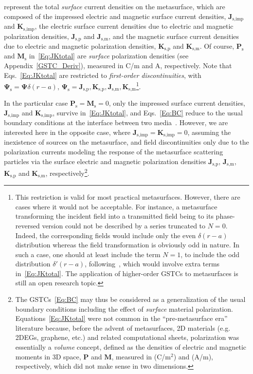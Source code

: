 \documentclass[journal,transaction]{IEEEtran}
\newcommand{\ve}[1]{\mathbf{#1}}
\newcommand{\ves}[1]{\boldsymbol{#1}}
\begin{document}
represent the total \emph{surface} current densities on the metasurface, which are composed of the impressed electric and magnetic surface current densities, $\ve{J}_\text{s,imp}$ and $\ve{K}_\text{s,imp}$, the electric surface current densities due to electric and magnetic polarization densities, $\ve{J}_\text{s,p}$ and $\ve{J}_\text{s,m}$, and the magnetic surface current densities due to electric and magnetic polarization densities, $\ve{K}_\text{s,p}$ and $\ve{K}_\text{s,m}$. Of course, $\ve{P}_\text{s}$ and $\ve{M}_\text{s}$ in~\eqref{Eq:JKtotal} are \emph{surface} polarization densities (see Appendix~\ref{GSTC_Deriv}), measured in C/m and A, respectively. Note that Eqs.~\eqref{Eq:JKtotal} are restricted to \emph{first-order discontinuities}, with $\ves{\Psi}_\text{s}=\ves{\Psi}\delta(r-a)$, $\ves{\Psi}_\text{s}=\ve{J}_\text{s,p},\ve{K}_\text{s,p},\ve{J}_\text{s,m},\ve{K}_\text{s,m}$\footnote{This restriction is valid for most practical metasurfaces. However, there are cases where it would not be acceptable. For instance, a metasurface transforming the incident field into a transmitted field being to its phase-reversed version could not be described by a series truncated to $N=0$. Indeed, the corresponding fields would include only the even $\delta(r-a)$ distribution whereas the field transformation is obviously odd in nature. In such a case, one should at least include the term $N=1$, to include the odd distribution $\delta'(r-a)$, following~\cite{GSTCs_Idemen2011,synthesis_planar_KA2015}, which would involve extra terms in~\eqref{Eq:JKtotal}. The application of higher-order GSTCs to metasurfaces is still an open research topic.}.

In the particular case $\ve{P}_\text{s}=\ve{M}_\text{s}=0$, only the impressed surface current densities, $\ve{J}_\text{s,imp}$ and $\ve{K}_\text{s,imp}$, survive in~\eqref{Eq:JKtotal}, and Eqs.~\eqref{Eq:BC} reduce to the usual boundary conditions at the interface between two media~\cite{rothwell2008electromagnetics}. However, we are interested here in the opposite case, where $\ve{J}_\text{s,imp}=\ve{K}_\text{s,imp}=0$, assuming the inexistence of sources on the metasurface, and field discontinuities only due to the polarization currents modeling the response of the metasurface scattering particles via the surface electric and magnetic polarization densities $\ve{J}_\text{s,p}$, $\ve{J}_\text{s,m}$, $\ve{K}_\text{s,p}$ and $\ve{K}_\text{s,m}$, respectively\footnote{The GSTCs~\eqref{Eq:BC} may thus be considered as a generalization of the usual boundary conditions including the effect of \emph{surface} material polarization. Equations~\eqref{Eq:JKtotal} were not common in the ``pre-metasurface era'' literature because, before the advent of metasurfaces, 2D materials (e.g. 2DEGs, graphene, etc.) and related computational sheets, polarization was essentially a \emph{volume} concept, defined as the densities of electric and magnetic moments in 3D space, $\ve{P}$ and $\ve{M}$, measured in (C/m$^2$) and (A/m), respectively, which did not make sense in two dimensions.}.
\end{document}
